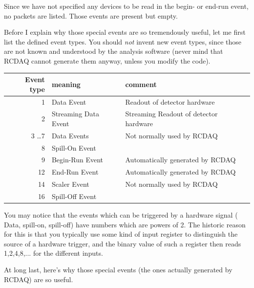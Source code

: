 \documentclass{article}[11pt]
\begin{document}
Since we have not specified any devices to be read in the begin- or end-run event,
no packets are listed. Those events are present but empty.

Before I explain why those special events are so tremendously useful,
let me first list the defined event types. You should \emph{not}
invent new event types, since those are not known and understood by the
analysis software (never mind that RCDAQ cannot generate them anyway,
unless you modify the code).

\begin{center}
\begin{tabular}{|r|l|l|}
\hline
Event type & meaning & comment \\
\hline
\hline
    1 & Data Event &  Readout of detector hardware\\ \hline
    2 & Streaming Data Event &  Streaming Readout of detector hardware\\ \hline
    3 \dots 7 & Data Events & Not normally used by RCDAQ \\ \hline
    8  & Spill-On Event &  \\ \hline
    9  & Begin-Run Event & Automatically generated by RCDAQ \\ \hline
    12 & End-Run Event & Automatically generated by RCDAQ  \\ \hline
    14 & Scaler Event  & Not normally used by RCDAQ \\ \hline
    16 & Spill-Off Event  &  \\ \hline
\hline
\end{tabular}
\end{center}

You may notice that the events which can be triggered by a hardware
signal ( Data, spill-on, spill-off) have numbers which are powers of
2. The historic reason for this is that you typically use some kind of
input register to distinguish the source of a hardware trigger, and
the binary value of such a register then reads 1,2,4,8,... for the different
inputs.

At long last, here's why those special events (the ones
actually generated by RCDAQ) are so useful.
\end{document}
